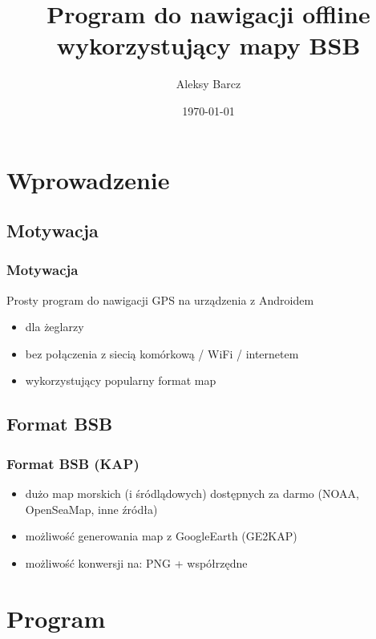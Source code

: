 \documentclass{beamer}
\author{Aleksy Barcz}
\title{Program do nawigacji offline wykorzystujący mapy BSB}
\date{\today}
\institute{Instytut Informatyki \\ Politechnika Warszawska}
\begin{document}
\frame{\titlepage}

\section{Wprowadzenie}
\subsection{Motywacja}
\begin{frame}
\frametitle{Motywacja}
Prosty program do nawigacji GPS na urządzenia z Androidem
\begin{itemize}
	\item {dla żeglarzy}
	\item {bez połączenia z siecią komórkową / WiFi / internetem}
	\item {wykorzystujący popularny format map}
\end{itemize}
\end{frame}

\subsection{Format BSB}
\begin{frame}
\frametitle{Format BSB (KAP)}
\begin{itemize}
	\item {dużo map morskich (i śródlądowych) dostępnych za darmo (NOAA, OpenSeaMap, inne źródła)}
	\item {możliwość generowania map z GoogleEarth (GE2KAP)}
	\item {możliwość konwersji na: PNG + współrzędne \smiley}
\end{itemize}
\end{frame}

\section{Program}
\end{document}
